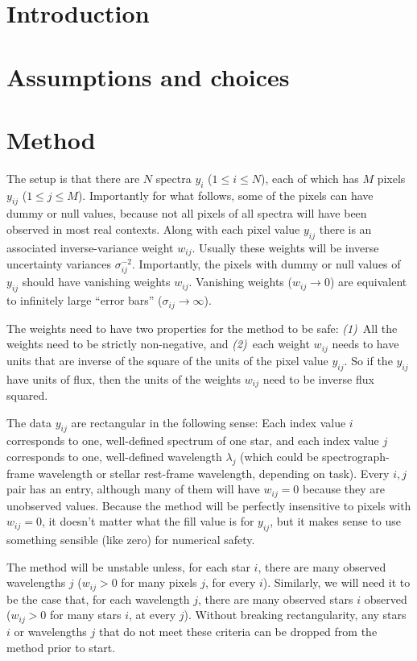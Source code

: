 \documentclass{article}
\begin{document}
\section{Introduction}

\section{Assumptions and choices}

\section{Method}
The setup is that there are $N$ spectra $y_i$ ($1\leq i\leq N$),
each of which has $M$ pixels $y_{ij}$ ($1\leq j\leq M$).
Importantly for what follows, some of the pixels can have dummy or null values, because not all pixels of all spectra will have been observed in most real contexts.
Along with each pixel value $y_{ij}$ there is an associated inverse-variance weight $w_{ij}$.
Usually these weights will be inverse uncertainty variances $\sigma_{ij}^{-2}$.
Importantly, the pixels with dummy or null values of $y_{ij}$ should have vanishing weights $w_{ij}$.
Vanishing weights ($w_{ij}\rightarrow 0$) are equivalent to infinitely large ``error bars'' ($\sigma_{ij}\rightarrow\infty$).

The weights need to have two properties for the method to be safe:
\textsl{(1)}~All the weights need to be strictly non-negative, and
\textsl{(2)}~each weight $w_{ij}$ needs to have units that are inverse of the square of the units of the pixel value $y_{ij}$.
So if the $y_{ij}$ have units of flux, then the units of the weights $w_{ij}$ need to be inverse flux squared.

The data $y_{ij}$ are rectangular in the following sense:
Each index value $i$ corresponds to one, well-defined spectrum of one star, and
each index value $j$ corresponds to one, well-defined wavelength $\lambda_j$ (which could be spectrograph-frame wavelength or stellar rest-frame wavelength, depending on task).
Every $i,j$ pair has an entry, although many of them will have $w_{ij}=0$ because they are unobserved values.
Because the method will be perfectly insensitive to pixels with $w_{ij}=0$, it doesn't matter what the fill value is for $y_{ij}$, but it makes sense to use something sensible (like zero) for numerical safety.

The method will be unstable unless, for each star $i$, there are many observed wavelengths $j$ ($w_{ij} > 0$ for many pixels $j$, for every $i$).
Similarly, we will need it to be the case that, for each wavelength $j$, there are many observed stars $i$ observed ($w_{ij} > 0$ for many stars $i$, at every $j$).
Without breaking rectangularity, any stars $i$ or wavelengths $j$ that do not meet these criteria can be dropped from the method prior to start.
\end{document}

